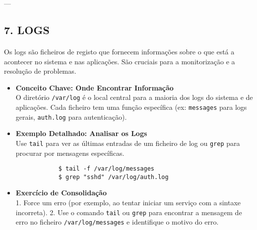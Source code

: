 \documentclass[10pt,a4paper]{article}
\begin{document}
	---
	
	\subsection*{7. LOGS}
	\vspace{-1.2em}
	\paragraph{}
	Os logs são ficheiros de registo que fornecem informações sobre o que está a acontecer no sistema e nas aplicações. São cruciais para a monitorização e a resolução de problemas.
	
	\begin{itemize}
		\item \textbf{Conceito Chave: Onde Encontrar Informação} \\
		O diretório \texttt{/var/log} é o local central para a maioria dos logs do sistema e de aplicações. Cada ficheiro tem uma função específica (ex: \texttt{messages} para logs gerais, \texttt{auth.log} para autenticação).
		
		\item \textbf{Exemplo Detalhado: Analisar os Logs} \\
		Use \texttt{tail} para ver as últimas entradas de um ficheiro de log ou \texttt{grep} para procurar por mensagens específicas.
		\begin{verbatim}
			$ tail -f /var/log/messages
			$ grep "sshd" /var/log/auth.log
		\end{verbatim}
		
		\item \textbf{Exercício de Consolidação} \\
		1. Force um erro (por exemplo, ao tentar iniciar um serviço com a sintaxe incorreta).
		2. Use o comando \texttt{tail} ou \texttt{grep} para encontrar a mensagem de erro no ficheiro \texttt{/var/log/messages} e identifique o motivo do erro.
	\end{itemize}
	
	
\end{document}
